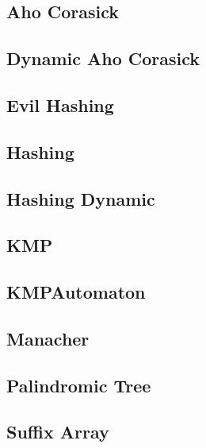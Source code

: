 \subsection{Aho Corasick}
\raggedbottom
\hrulefill
\subsection{Dynamic Aho Corasick}
\raggedbottom
\hrulefill
\subsection{Evil Hashing}
\raggedbottom
\hrulefill
\subsection{Hashing}
\raggedbottom
\hrulefill
\subsection{Hashing Dynamic}
\raggedbottom
\hrulefill
\subsection{KMP}
\raggedbottom
\hrulefill
\subsection{KMPAutomaton}
\raggedbottom
\hrulefill
\subsection{Manacher}
\raggedbottom
\hrulefill
\subsection{Palindromic Tree}
\raggedbottom
\hrulefill
\subsection{Suffix Array}
\raggedbottom
\hrulefill
